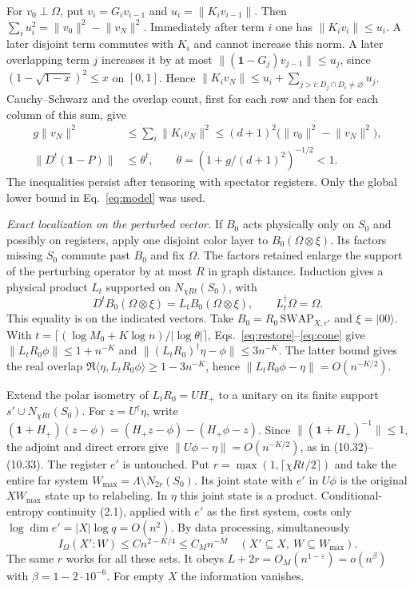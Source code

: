 \documentclass[aps,prb,onecolumn,10pt,nofootinbib]{revtex4-2}
\newcommand{\id}{\mathbf{1}}
\providecommand{\ket}[1]{\lvert #1\rangle}
\newcommand{\norm}[1]{\lVert #1\rVert}
\begin{document}
For $v_0\perp\Omega$, put $v_i=G_i v_{i-1}$ and $u_i=\norm{K_i v_{i-1}}$. Then $\sum_i u_i^2=\norm{v_0}^2-\norm{v_N}^2$. Immediately after term $i$ one has $\norm{K_i v_i}\le u_i$. A later disjoint term commutes with $K_i$ and cannot increase this norm. A later overlapping term $j$ increases it by at most $\norm{(\id-G_j)v_{j-1}}\le u_j$, since $(1-\sqrt{1-x})^2\le x$ on $[0,1]$. Hence $\norm{K_i v_N}\le u_i+\sum_{j>i:D_j\cap D_i\ne\varnothing}u_j$. Cauchy--Schwarz and the overlap count, first for each row and then for each column of this sum, give
\begin{align}
 g\norm{v_N}^2
 &\le\sum_i\norm{K_i v_N}^2
 \le(d+1)^2\bigl(\norm{v_0}^2-\norm{v_N}^2\bigr),\nonumber\\
 \norm{D^t(\id-P)}&\le \theta^t,\qquad
 \theta=(1+g/(d+1)^2)^{-1/2}<1 .
 \label{eq:sweep}
\end{align}
The inequalities persist after tensoring with spectator registers. Only the global lower bound in Eq.~\eqref{eq:model} was used.

\emph{Exact localization on the perturbed vector.}
If $B_0$ acts physically only on $S_0$ and possibly on registers, apply one disjoint color layer to $B_0(\Omega\otimes\xi)$. Its factors missing $S_0$ commute past $B_0$ and fix $\Omega$. The factors retained enlarge the support of the perturbing operator by at most $R$ in graph distance. Induction gives a physical product $L_t$ supported on $N_{\chi Rt}(S_0)$, with
\begin{equation}
 D^t B_0(\Omega\otimes\xi)=L_t B_0(\Omega\otimes\xi),
 \qquad L_t^\dagger\Omega=\Omega .
 \label{eq:cone}
\end{equation}
This equality is on the indicated vectors. Take $B_0=R_0\,\mathrm{SWAP}_{X,e'}$ and $\xi=\ket{00}$. With $t=\lceil(\log M_0+K\log n)/|\log\theta|\rceil$, Eqs.~\eqref{eq:restore}--\eqref{eq:cone} give $\norm{L_tR_0\phi}\le1+n^{-K}$ and $\norm{(L_tR_0)^\dagger\eta-\phi}\le3n^{-K}$. The latter bound gives the real overlap $\Re\langle\eta,L_tR_0\phi\rangle\ge1-3n^{-K}$, hence $\norm{L_tR_0\phi-\eta}=O(n^{-K/2})$.

Extend the polar isometry of $L_tR_0=U H_+$ to a unitary on its finite support $s'\cup N_{\chi Rt}(S_0)$. For $z=U^\dagger\eta$, write $(\id+H_+)(z-\phi)=(H_+z-\phi)-(H_+\phi-z)$. Since $\norm{(\id+H_+)^{-1}}\le1$, the adjoint and direct errors give $\norm{U\phi-\eta}=O(n^{-K/2})$, as in (10.32)--(10.33). The register $e'$ is untouched. Put $r=\max(1,\lceil\chi Rt/2\rceil)$ and take the entire far system $W_{\max}=\Lambda\setminus N_{2r}(S_0)$. Its joint state with $e'$ in $U\phi$ is the original $XW_{\max}$ state up to relabeling. In $\eta$ this joint state is a product. Conditional-entropy continuity (2.1), applied with $e'$ as the first system, costs only $\log\dim e'=|X|\log q=O(n^2)$. By data processing, simultaneously
\begin{equation}
 I_\Omega(X':W)\le C n^{2-K/4}\le C_M n^{-M}
 \quad(X'\subseteq X,\ W\subseteq W_{\max}).
 \label{eq:far}
\end{equation}
The same $r$ works for all these sets. It obeys $L+2r=O_M(n^{1-\varepsilon})=o(n^\beta)$ with $\beta=1-2\cdot10^{-6}$. For empty $X$ the information vanishes.
\end{document}
